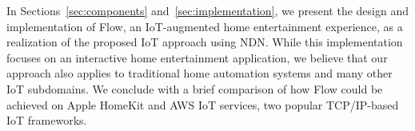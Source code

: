 In Sections~\ref{sec:components} and~\ref{sec:implementation}, we present the design and implementation of Flow, an IoT-augmented home entertainment experience, as a realization of the proposed IoT approach using NDN. 
While this implementation focuses on an interactive home entertainment application, we believe that our approach also applies to traditional home automation systems and many other IoT subdomains. We conclude with a brief comparison of how Flow could be achieved on Apple HomeKit and AWS IoT services, two popular TCP/IP-based IoT frameworks.

